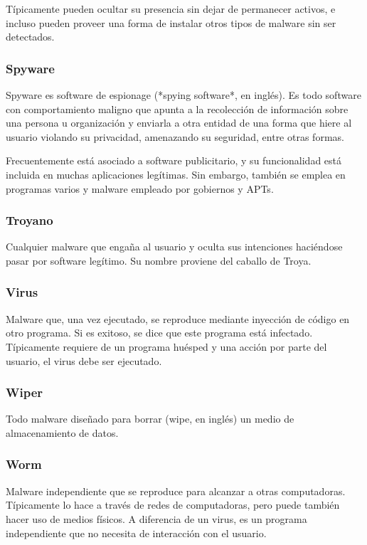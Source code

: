 \documentclass{article}
\begin{document}
Típicamente pueden ocultar su presencia sin dejar de permanecer activos, e incluso pueden proveer una forma de instalar otros tipos de malware sin ser detectados.

\subsubsection{Spyware}
Spyware es software de espionage (*spying software*, en inglés). Es todo software con comportamiento maligno que apunta a la recolección de información sobre una persona u organización y enviarla a otra entidad de una forma que hiere al usuario violando su privacidad, amenazando su seguridad, entre otras formas.

Frecuentemente está asociado a software publicitario, y su funcionalidad está incluida en muchas aplicaciones legítimas. Sin embargo, también se emplea en programas varios y malware empleado por gobiernos y APTs.

\subsubsection{Troyano}
Cualquier malware que engaña al usuario y oculta sus intenciones haciéndose pasar por software legítimo. Su nombre proviene del caballo de Troya.

\subsubsection{Virus}
Malware que, una vez ejecutado, se reproduce mediante inyección de código en otro programa. Si es exitoso, se dice que este programa está infectado. Típicamente requiere de un programa huésped y una acción por parte del usuario, el virus debe ser ejecutado.

\subsubsection{Wiper}
Todo malware diseñado para borrar (wipe, en inglés) un medio de almacenamiento de datos.

\subsubsection{Worm}
Malware independiente que se reproduce para alcanzar a otras computadoras. Típicamente lo hace a través de redes de computadoras, pero puede también hacer uso de medios físicos. A diferencia de un virus, es un programa independiente que no necesita de interacción con el usuario.
\end{document}
